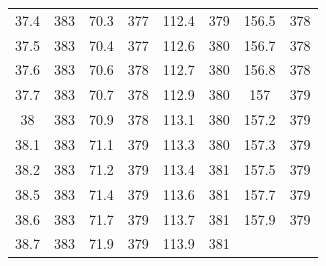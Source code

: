 \documentclass[12pt]{ctexart}
\numberwithin{equation}{section}
\begin{document}
\begin{longtable}{cc|cc|cc|cc}
37.4  &  383  &  70.3  &  377  &  112.4  &  379  &  156.5  &  378  \\
37.5  &  383  &  70.4  &  377  &  112.6  &  380  &  156.7  &  378  \\
37.6  &  383  &  70.6  &  378  &  112.7  &  380  &  156.8  &  378  \\
37.7  &  383  &  70.7  &  378  &  112.9  &  380  &  157  &  379  \\
38  &  383  &  70.9  &  378  &  113.1  &  380  &  157.2  &  379  \\
38.1  &  383  &  71.1  &  379  &  113.3  &  380  &  157.3  &  379  \\
38.2  &  383  &  71.2  &  379  &  113.4  &  381  &  157.5  &  379  \\
38.5  &  383  &  71.4  &  379  &  113.6  &  381  &  157.7  &  379  \\
38.6  &  383  &  71.7  &  379  &  113.7  &  381  &  157.9  &  379  \\
38.7  &  383  &  71.9  &  379  &  113.9  &  381  \\

\end{longtable}
\end{document}
